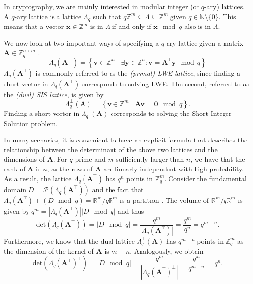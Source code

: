 In cryptography, we are mainly interested in modular integer (or $q$-ary) lattices. A $q$-ary lattice is a lattice $\Lambda_q$ such that $q\mathbb{Z}^m \subseteq	\Lambda \subseteq	\mathbb{Z}^m$ given $q \in \mathbb{N}\setminus \{0\}$. This means that a vector $\mathbf{x} \in \mathbb{Z}^m$ is in $\Lambda$ if and only if $\mathbf{x} \mod q$ also is in $\Lambda$.

We now look at two important ways of specifying a $q$-ary lattice given a matrix $\mathbf{A} \in \mathbb{Z}_q^{n\times m}$ \cite{BBGS19}.\begin{equation}\label{eq:lwe-lattice}
    \Lambda_q(\mathbf{A}^\intercal) = \left\{ \mathbf{v} \in \mathbb{Z}^m \mid \exists \mathbf{y} \in \mathbb{Z}^n : \mathbf{v} = \mathbf{A}^\intercal \mathbf{y} \mod q \right\}
\end{equation}
$\Lambda_q(\mathbf{A}^\intercal)$ is commonly referred to as the \textit{(primal) LWE lattice}, since finding a short vector in $\Lambda_q(\mathbf{A}^\intercal)$ corresponds to solving LWE. The second, referred to as the \textit{(dual) SIS lattice}, is given by
\begin{equation}\label{eq:sis-lattice}
    \Lambda_q^\perp(\mathbf{A}) = \left\{ \mathbf{v} \in \mathbb{Z}^m \mid  \mathbf{A}\mathbf{v} = \mathbf{0} \mod q \right\}.
\end{equation}
Finding a short vector in $\Lambda_q^\perp(\mathbf{A})$ corresponds to solving the Short Integer Solution problem.


In many scenarios, it is convenient to have an explicit formula that describes the relationship between the determinant of the above two lattices and the dimensions of $\mathbf{A}$. For $q$ prime and $m$ sufficiently larger than $n$, we have that the rank of $\mathbf{A}$ is $n$, as the rows of $\mathbf{A}$ are linearly independent with high probability. As a result, the lattice $\Lambda_q(\mathbf{A}^\intercal)$ has $q^n$ points in $\mathbb{Z}_q^m$.
Consider the fundamental domain $D = \mathcal{P}(\Lambda_q(\mathbf{A}^\intercal))$ and the fact that $\Lambda_q(\mathbf{A}^\intercal) + (D \mod q) = \mathbb{R}^m/q\mathbb{R}^m$ is a partition \cite{volume-lattice}. The volume of $\mathbb{R}^m/q\mathbb{R}^m$ is given by $q^m =|\Lambda_q(\mathbf{A}^\intercal)||D \mod q|$ and thus
\begin{equation}\label{eq:det-MR}
    \text{det}(\Lambda_q(\mathbf{A}^\intercal)) = |D \mod q| = \frac{q^m}{|\Lambda_q(\mathbf{A}^\intercal)|} = \frac{q^{m}}{q^{n}} = q^{m-n}.
\end{equation}
Furthermore, we know that the dual lattice  $\Lambda_q^\perp(\mathbf{A})$ has $q^{m-n}$ points in $\mathbb{Z}_q^m$ as the dimension of the kernel of $\mathbf{A}$ is $m-n$. Analogously, we obtain
\begin{equation}\label{eq:det-MR-dual}
    \text{det}(\Lambda_q(\mathbf{A}^\intercal)^{\perp}) = |D \mod q| = \frac{q^m}{|\Lambda_q(\mathbf{A}^\intercal)^{\perp}|} = \frac{q^{m}}{q^{m-n}} = q^n.
\end{equation}


